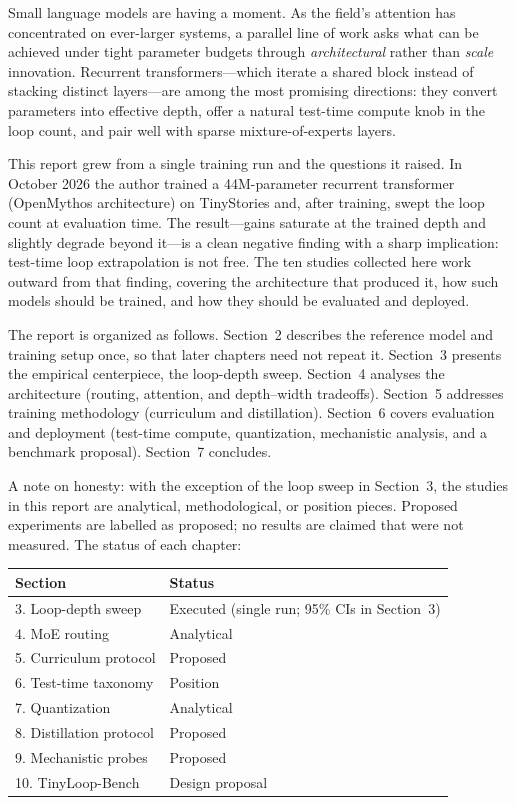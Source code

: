 Small language models are having a moment. As the field's attention
has concentrated on ever-larger systems, a parallel line of work asks
what can be achieved under tight parameter budgets through
\emph{architectural} rather than \emph{scale} innovation. Recurrent
transformers---which iterate a shared block instead of stacking distinct
layers---are among the most promising directions: they convert
parameters into effective depth, offer a natural test-time compute knob
in the loop count, and pair well with sparse mixture-of-experts layers.

This report grew from a single training run and the questions it
raised. In October 2026 the author trained a 44M-parameter recurrent
transformer (OpenMythos architecture) on TinyStories and, after
training, swept the loop count at evaluation time. The result---gains
saturate at the trained depth and slightly degrade beyond it---is a clean negative finding
with a sharp implication: test-time loop extrapolation is not free.
The ten studies collected here work outward from that finding,
covering the architecture that produced it, how such models should be
trained, and how they should be evaluated and deployed.

The report is organized as follows. Section~2 describes the reference
model and training setup once, so that later chapters need not repeat
it. Section~3 presents the empirical centerpiece, the loop-depth sweep.
Section~4 analyses the architecture (routing, attention, and
depth--width tradeoffs). Section~5 addresses training methodology
(curriculum and distillation). Section~6 covers evaluation and
deployment (test-time compute, quantization, mechanistic analysis, and
a benchmark proposal). Section~7 concludes.

A note on honesty: with the exception of the loop sweep in Section~3,
the studies in this report are analytical, methodological, or position
pieces. Proposed experiments are labelled as proposed; no results are
claimed that were not measured. The status of each chapter:

\begin{center}
{\small
\begin{tabular}{lp{4.0cm}}
\toprule
Section & Status \\
\midrule
3. Loop-depth sweep & Executed (single run; 95\% CIs in Section~3) \\
4. MoE routing & Analytical \\
5. Curriculum protocol & Proposed \\
6. Test-time taxonomy & Position \\
7. Quantization & Analytical \\
8. Distillation protocol & Proposed \\
9. Mechanistic probes & Proposed \\
10. TinyLoop-Bench & Design proposal \\
\bottomrule
\end{tabular}}
\end{center}
